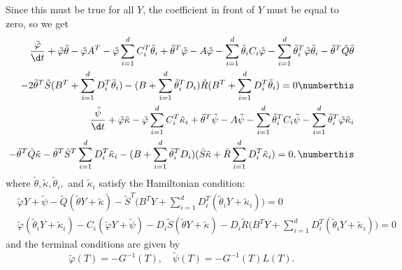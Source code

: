 Since this must be true for all $Y$, the coefficient in front of $Y$ must be equal to zero, so we get
\begin{align*}
    \frac{\tilde{\varphi}}{\d t} + \tilde{\varphi} \tilde{\theta} - \tilde{\varphi} A^T - \tilde{\varphi} \sum_{i=1}^d C_i^T \tilde{\theta}_i + \tilde{\theta}^T \tilde{\varphi} - A \tilde{\varphi} -\sum_{i=1}^d \tilde{\theta}_i C_i \tilde{\varphi} - \sum_{i=1}^d\tilde{\theta}_i^T\tilde{\varphi} \tilde{\theta}_i - \tilde{\theta}^T \tilde{Q}\tilde{\theta}\\
    - 2\tilde{\theta}^T \tilde{S}(B^T + \sum_{i=1}^d D_i^T \tilde{\theta}_i) - (B + \sum_{i=1}^d\tilde{\theta}_i^T D_i)\tilde{R} (B^T + \sum_{i=1}^d D_i^T \tilde{\theta}_i) = 0 \numberthis 
    \label{eq: dual_bsde_sol1}\\
    \frac{\tilde{\psi}}{\d t} + \tilde{\varphi} \tilde{\kappa} - \tilde{\varphi} \sum_{i=1}^d C_i^T \tilde{\kappa}_i + \tilde{\theta}^T \tilde{\psi} - A \tilde{\psi} - \sum_{i=1}^d \tilde{\theta}_i^T C_i \tilde{\psi} - \sum_{i=1}^d \tilde{\theta}_i^T \tilde{\varphi} \tilde{\kappa}_i\\
    -\tilde{\theta}^T \tilde{Q} \tilde{\kappa} - \tilde{\theta}^T \tilde{S}^T\sum_{i=1}^d D_i^T\tilde{\kappa}_i - (B + \sum_{i=1}^d\tilde{\theta}_i^T D_i) (\tilde{S}\tilde{\kappa} + \tilde{R} \sum_{i=1}^d D_i^T \tilde{\kappa}_i) = 0, \numberthis \label{eq: dual_bsde_sol2}
\end{align*}
where $\tilde{\theta}, \tilde{\kappa}, \tilde{\theta}_i,$ and $\tilde{\kappa}_i$ satisfy the Hamiltonian condition:
\begin{align*}
    &\tilde{\varphi} Y + \tilde{\psi} - \tilde{Q}(\tilde{\theta} Y + \tilde{\kappa}) - \tilde{S}^T \bigg(B^T Y + \sum_{i=1}^d D_i^T (\tilde{\theta}_i Y + \tilde{\kappa}_i)\bigg)= 0\\
    &\tilde{\varphi}( \tilde{\theta}_i Y +  \tilde{\kappa}_i) - C_i (\tilde{\varphi} Y + \tilde{\psi}) - D_i \tilde{S}(\tilde{\theta} Y + \tilde{\kappa}) - D_i \tilde{R}\bigg(B^T Y + \sum_{i=1}^d D_i^T (\tilde{\theta}_iY + \tilde{\kappa}_i)\bigg) = 0
\end{align*}
and the terminal conditions are given by
\begin{equation*}
    \tilde{\varphi}(T) = - G^{-1}(T), \quad \tilde{\psi}(T) = - G^{-1}(T) L(T).
\end{equation*}


